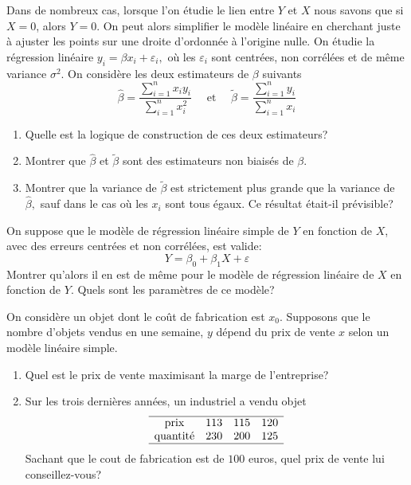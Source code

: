 \documentclass{td_um}
\providecommand{\1}{\mathds{1}}
\begin{document}
\cor{\newpage}

\exo{}
Dans de nombreux cas, lorsque l'on étudie le lien entre $Y$ et $X$ nous savons que si $X=0$, alors $Y=0$. On peut alors simplifier le modèle linéaire en cherchant juste à ajuster les points sur une droite d'ordonnée à l'origine nulle. On étudie la régression linéaire $y_{i}=\beta x_{i}+\varepsilon_{i},$ où les $\varepsilon_{i}$ sont centrées, non corrélées et de même variance $\sigma^{2}$. On considère les deux estimateurs de $\beta$ suivants
\[
\hat{\beta}=\frac{\sum_{i=1}^{n} x_{i} y_{i}}{\sum_{i=1}^{n} x_{i}^{2}} \quad \text { et } \quad \tilde{\beta}=\frac{\sum_{i=1}^{n} y_{i}}{\sum_{i=1}^{n} x_{i}}
\]
\begin{enumerate}
    \item  Quelle est la logique de construction de ces deux estimateurs?
    \item   Montrer que $\hat{\beta}$ et $\tilde{\beta}$ sont des estimateurs non biaisés de $\beta$.
    \item   Montrer que la variance de $\tilde{\beta}$ est strictement plus grande que la variance de
        $\hat{\beta},$ sauf dans le cas où les $x_{i}$ sont tous égaux. Ce résultat était-il prévisible?
\end{enumerate}


\cor{\newpage}

\exo{}
On suppose que le modèle de régression linéaire simple de $Y$ en fonction de $X$, avec des erreurs centrées et non corrélées, est valide:
\[
Y=\beta_{0}+\beta_{1} X+\varepsilon
\]
Montrer qu'alors il en est de même pour le modèle de régression linéaire de $X$ en fonction de $Y$. Quels sont les paramètres de ce modèle?


\cor{\newpage}

\exo{}
On considère un objet dont le coût de fabrication est $x_{0}$. Supposons que le nombre d'objets vendus en une semaine, $y$ dépend du prix de vente $x$ selon un modèle linéaire simple.
\begin{enumerate}
    \item  Quel est le prix de vente maximisant la marge de l'entreprise?
    \item  Sur les trois dernières années, un industriel a vendu objet
    \[
            \begin{array}[]{cccc}
                \hline
                \text{prix} & 113 & 115 & 120 \\
                \text{quantité} & 230 & 200 & 125 \\
                \hline
            \end{array}
        \]
        Sachant que le cout de fabrication est de $100$ euros, quel prix de vente lui conseillez-vous?
\end{enumerate}
\end{document}
